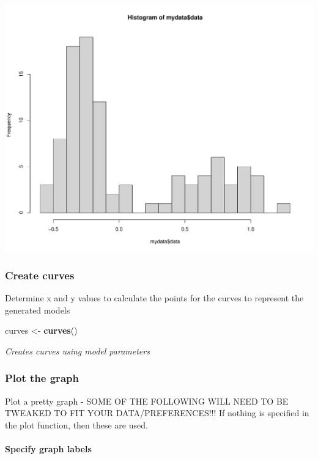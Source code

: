 \documentclass[
]{article}
\newenvironment{Shaded}{\begin{snugshade}}{\end{snugshade}}
\newcommand{\FunctionTok}[1]{\textcolor[rgb]{0.13,0.29,0.53}{\textbf{#1}}}
\newcommand{\NormalTok}[1]{#1}
\newcommand{\OtherTok}[1]{\textcolor[rgb]{0.56,0.35,0.01}{#1}}
\begin{document}
\begin{center}\includegraphics{man/cutoffvalue_figures/README-basic-histogram-1} \end{center}

\subsubsection{Create curves}\label{create-curves}

Determine x and y values to calculate the points for the curves to
represent the generated models

\begin{Shaded}
\begin{Highlighting}[]
\NormalTok{curves }\OtherTok{\textless{}{-}} \FunctionTok{curves}\NormalTok{()}
\end{Highlighting}
\end{Shaded}

\emph{Creates curves using model parameters}

\subsubsection{Plot the graph}\label{plot-the-graph}

Plot a pretty graph - SOME OF THE FOLLOWING WILL NEED TO BE TWEAKED TO
FIT YOUR DATA/PREFERENCES!!! If nothing is specified in the plot
function, then these are used.

\paragraph{Specify graph labels}\label{specify-graph-labels}
\end{document}
